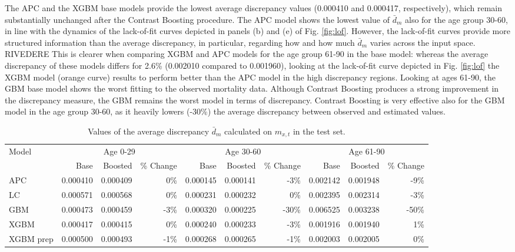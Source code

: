 \documentclass[fleqn,10pt]{wlscirep}
\begin{document}
The APC and the XGBM base models provide the lowest average discrepancy values (0.000410 and 0.000417, respectively), which remain substantially unchanged after the Contrast Boosting procedure.
The APC model shows the lowest value of $\bar{d}_m$ also for the age group 30-60, in line with the dynamics of the lack-of-fit curves depicted in panels (b) and (e) of Fig. \ref{fig:lof}.
However, the lack-of-fit curves provide more structured information than the average discrepancy, in particular, regarding how and how much $\bar{d}_m$ varies across the input space. \color{red}RIVEDERE This is clearer when comparing XGBM and APC models for the age group 61-90 in the base model: whereas the average discrepancy of these models differs for 2.6\% (0.002010 compared to 0.001960), looking at the lack-of-fit curve depicted in Fig. \ref{fig:lof} the XGBM model (orange curve) results to perform better than the APC model in the high discrepancy regions. \color{black}
Looking at ages 61-90, the GBM base model shows the worst fitting to the observed mortality data. Although Contrast Boosting produces a strong improvement in the discrepancy measure, the GBM remains the worst model in terms of discrepancy. \color{blue}Contrast Boosting is very effective also for the GBM model in the age group 30-60, as it heavily lowers (-30\%) the average discrepancy between observed and estimated values.\color{black}
%
\begin{table}[ht]
\centering
\footnotesize
\begin{tabular}{|l|r|r|r|r|r|r|r|r|r|}
\hline
\multirow{2}{*}{Model} & \multicolumn{3}{c|}{Age 0-29} & \multicolumn{3}{c|}{Age 30-60} & \multicolumn{3}{c|}{Age 61-90} \\
\cline{2-10}
			&	Base 	&	Boosted 	& \% Change &	Base 	&	Boosted 	& \% Change &	Base 	&	Boosted	& \% Change\\
\hline
APC 	&	0.000410	&	0.000409	&	0\%	&	0.000145	&	0.000141	&	-3\%	&	0.002142	&	0.001948	&	-9\%	\\
LC 	&	0.000571	&	0.000568	&	0\%	&	0.000231	&	0.000232	&	0\%	&	0.002395	&	0.002314	&	-3\%	\\
GBM 	&	0.000473	&	0.000459	&	-3\%	&	0.000320	&	0.000225	&	-30\%	&	0.006525	&	0.003238	&	-50\%	\\
XGBM 	&	0.000417	&	0.000415	&	0\%	&	0.000240	&	0.000233	&	-3\%	&	0.001916	&	0.001940	&	1\%	\\
XGBM prep 	&	0.000500	&	0.000493	&	-1\%	&	0.000268	&	0.000265	&	-1\%	&	0.002003	&	0.002005	&	0\%	\\
\hline
\end{tabular}
\caption{Values of the average discrepancy $\bar{d}_m$ calculated on $m_{x,t}$ in the test set.}
\label{tab:avecri}
\end{table}\\
\end{document}
